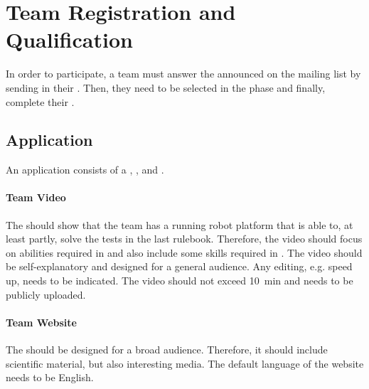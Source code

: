 \section{Team Registration and Qualification}
\label{sec:rules:particpation}

In order to participate, a team must answer the \CFP{} announced on the \AtHome{} mailing list by sending in their \Application{}. Then, they need to be selected in the \Qualification{} phase and finally, complete their \Registration{}.

\subsection{Application}
\label{sec:rules:application}

An application consists of a \TeamVideo{}, \TeamWebsite{}, and \TDP{}.

\paragraph{Team Video}
\label{sec:rules:application:video}
The \TeamVideo{} should show that the team has a running robot platform that is able to, at least partly, solve the tests in the last rulebook. Therefore, the video should focus on abilities required in \SONE{} and also include some skills required in \STWO{}. The video should be self-explanatory and designed for a general audience. Any editing, e.g. speed up, needs to be indicated. The video should not exceed \SI{10}{\minute} and needs to be publicly uploaded.


\paragraph{Team Website}
\label{sec:rules:application:website}
The \TeamWebsite{} should be designed for a broad audience. Therefore, it should include scientific material, but also interesting media. The default language of the website needs to be English.


